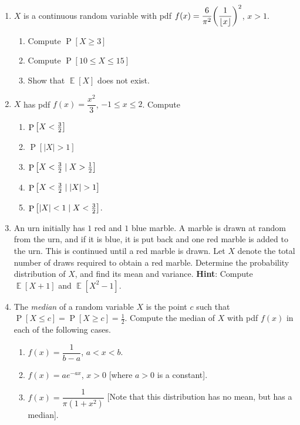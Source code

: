 \documentclass[svgnames]{amsart}
\DeclareMathOperator{\Prob}{P}
\DeclareMathOperator{\EV}{\mathbb E}
\begin{document}
\begin{enumerate}[leftmargin=*]
\item $X$ is a continuous random variable with pdf $f(x) = \dfrac 6 {\pi^2} \pqty{\dfrac 1 {\lfloor x \rfloor}}^2$, $x > 1$.
\begin{enumerate}
	\item Compute $\Prob[X \ge 3]$
	\item Compute $\Prob[10 \le X \le 15]$
	\item Show that $\EV[X]$ does not exist.
\end{enumerate}

\item $X$ has pdf $f(x) = \dfrac{x^2}{3}$, $-1 \le x \le 2$. Compute
\begin{enumerate}
	\item $\Prob \bqty{X < \frac 3 2}$
	\item $\Prob[|X| > 1]$
	\item $\Prob \bqty{X < \frac 3 2 \mid X > \frac 1 2}$
	\item $\Prob \bqty{X < \frac 3 2 \mid |X| > 1}$
	\item $\Prob \bqty{|X| < 1 \mid X < \frac 3 2}$.
\end{enumerate}

\item An urn initially has {\color{red} $1$ red} and {\color{blue} $1$ blue} marble. A marble is drawn at random from the urn, and if it is {\color{blue} blue}, it is put back and {\color{red} one red} marble is added to the urn. This is continued until a {\color{red} red} marble is drawn. Let $X$ denote the total number of draws required to obtain a {\color{red} red} marble. Determine the probability distribution of $X$, and find its mean and variance.
{\scriptsize\textbf{Hint}: Compute $\EV[X + 1]$ and $\EV[X^2 - 1]$.}

\item The \emph{median} of a random variable $X$ is the point $c$ such that $\Prob[X \le c] = \Prob[X \ge c] = \frac 1 2$. Compute the median of $X$ with pdf $f(x)$ in each of the following cases.
\begin{enumerate}[itemsep=1em]
	\item $f(x) = \dfrac 1 {b - a}$, $a < x < b$.
	\item $f(x) = a e^{-ax}$, $x > 0$ [where $a > 0$ is a constant].
	\item $f(x) = \dfrac{1}{\pi(1 + x^2)}$ [Note that this distribution has no mean, but has a median].
\end{enumerate}
\end{enumerate}
\end{document}
